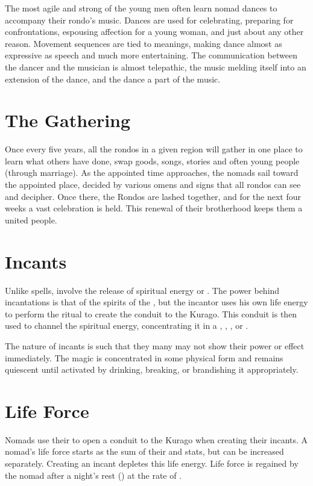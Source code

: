 \begin{multicols*}{2}
The most agile and strong of the young men often learn nomad dances to accompany their rondo's music. Dances are used for celebrating, preparing for confrontations, espousing affection for a young woman, and just about any other reason. Movement sequences are tied to meanings, making dance almost as expressive as speech and much more entertaining. The communication between the dancer and the musician is almost telepathic, the music melding itself into an extension of the dance, and the dance a part of the music.

\section{The Gathering}

Once every five years, all the rondos in a given region will gather in one place to learn what others have done, swap goods, songs, stories and often young people
(through marriage). As the appointed time approaches, the nomads sail toward the appointed place, decided by various omens and signs that all rondos can see and decipher. Once there, the Rondos are lashed together, and for the next four weeks a vast celebration is held. This renewal of their brotherhood keeps them a united people.

\section{Incants}
Unlike spells,  involve the release of spiritual energy or . The power behind incantations is that of the spirits of the , but the incantor uses his own life energy to perform the ritual to create the conduit to the Kurago. This conduit is then used to channel the spiritual energy, concentrating it in a , , ,  or . 

The nature of incants is such that they many may not show their power or effect immediately. The magic is concentrated in some physical form and remains quiescent until activated by drinking, breaking, or brandishing it appropriately.

\section{Life Force}

Nomads use their  to open a conduit to the Kurago when creating their incants. A nomad's life force starts as the sum of their \HEA and \PER stats, but can be increased separately. Creating an incant depletes this life energy. Life force is regained by the nomad after a night's rest () at the rate of .


\end{multicols*}
